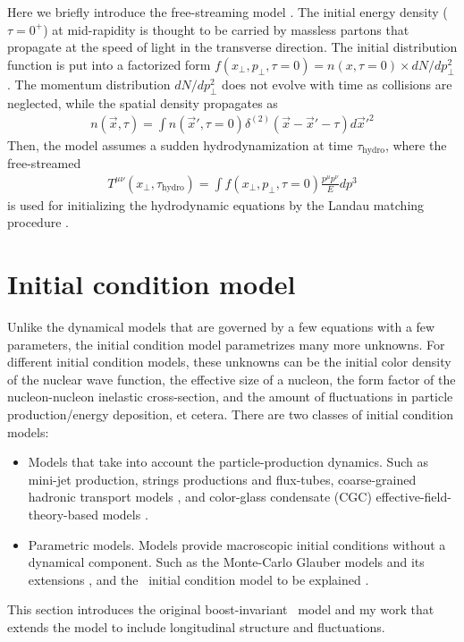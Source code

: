 Here we briefly introduce the free-streaming model \cite{Liu:2015nwa}.
The initial energy density ($\tau = 0^+$) at mid-rapidity is thought to be carried by massless partons that propagate at the speed of light in the transverse direction. 
The initial distribution function is put into a factorized form $f(x_\perp, p_\perp, \tau=0) = n(x, \tau=0) \times dN/dp_\perp^2$.
The momentum distribution $dN/dp_\perp^2$ does not evolve with time as collisions are neglected, while the spatial density propagates as
\begin{eqnarray}
n(\vec{x}, \tau) = \int n(\vec{x}', \tau=0) \delta^{(2)}(\vec{x} - \vec{x}'- \tau) d\vec{x}'^2
\end{eqnarray}
Then, the model assumes a sudden hydrodynamization at time $\tau_{\textrm{hydro}}$, where the free-streamed
\begin{eqnarray}
T^{\mu\nu}(x_\perp, \tau_{\textrm{hydro}}) = \int f(x_\perp, p_\perp, \tau=0) \frac{p^\mu p^\nu}{E} dp^3
\end{eqnarray}
is used for initializing the hydrodynamic equations by the Landau matching procedure \cite{Liu:2015nwa}.

\section{Initial condition model}
Unlike the dynamical models that are governed by a few equations with a few parameters, the initial condition model parametrizes many more unknowns.
For different initial condition models, these unknowns can be the initial color density of the nuclear wave function, the effective size of a nucleon, the form factor of the nucleon-nucleon inelastic cross-section, and the amount of fluctuations in particle production/energy deposition, et cetera.
There are two classes of initial condition models:
\begin{itemize}
\item Models that take into account the particle-production dynamics. Such as mini-jet production, strings productions and flux-tubes, coarse-grained hadronic transport models \cite{Wang:1991hta, Zhang:1999bd, Werner:2010aa, Bozek:2015bna, Petersen:2008dd}, and color-glass condensate (CGC) effective-field-theory-based models \cite{Schenke:2016ksl, Dumitru:2011wq, Hirano:2012kj}.
\item Parametric models. Models provide macroscopic initial conditions without a dynamical component. Such as the Monte-Carlo Glauber models and its extensions \cite{Bozek:2015bha, Rybczynski:2013yba}, and the \trento\ initial condition model to be explained \cite{Moreland:2014oya}.
\end{itemize}
This section introduces the original boost-invariant \trento\ model and my work that extends the model to include longitudinal structure and fluctuations.

